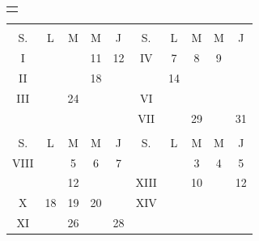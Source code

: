 \documentclass[11.9pt,letterpaper]{article}
\begin{document}
\begin{multicols}{2}
\begin{table}[H]
\begin{tabular}{|l|l|c|}
\end{tabular}
\end{table}
\newpage
\hspace*{0.5cm} 
\begin{center}
\begin{tabular}{c}
\cellcolor{gray!40}{PROGRAMACIÓN}
\end{tabular}
\end{center}
\begin{center}
\begin{tabular}{ccccc|ccccc}
\multicolumn{5}{c|}{\cellcolor{red!40}{SEPTIEMBRE}}&\multicolumn{5}{c}{\cellcolor{blue!40}{OCTUBRE}}\\
S.&L&M&M&J&S.&L&M&M&J\\
I &\cellcolor{gray!40}{9}&\cellcolor{gray!40}{10}&11&12&IV&7&8&9&\cellcolor{white}{10}\\
II&\cellcolor{gray!40}{16}&\cellcolor{gray!40}{17}&18&\cellcolor{white}{19}&\cellcolor{VIRTUAL}{V}&14&\cellcolor{gray!40}{15}&\cellcolor{EXAMEN}{$16\textcolor{TAREA}{\blacksquare}$}&\cellcolor{white}{17}\\
III&\cellcolor{white}{23}&24&\cellcolor{EXAMEN}{25}&\cellcolor{white}{26}&VI&\cellcolor{white}{21}&\cellcolor{white}{22}&\cellcolor{white}{23}&\cellcolor{white}{24}\\
&&&&&VII&\cellcolor{white}{28}&29&\cellcolor{EXAMEN}{30}&31\\
\multicolumn{5}{c|}{\cellcolor{cyan!40}{NOVIEMBRE}}&\multicolumn{5}{c}{\cellcolor{green!40}{DICIEMBRE}}\\
S.&L&M&M&J&S.&L&M&M&J\\
VIII&\cellcolor{white}{4}&5&6&7&\cellcolor{VIRTUAL}{XII}&\cellcolor{white}{2}&3&4&5\\
\cellcolor{VIRTUAL}{IX}&\cellcolor{white}{11}&12&\cellcolor{EXAMEN}{$13\textcolor{TAREA}{\blacksquare}$}&\cellcolor{white}{14}&XIII&\cellcolor{white}{9}&10&\cellcolor{EXAMEN}{$11\textcolor{TAREA}{\blacksquare}$}&12\\
X&18&19&20&\cellcolor{white}{21}&XIV&\cellcolor{gray!40}{16}&\cellcolor{gray!40}{17}&\cellcolor{gray!40}{18}&\\
XI&\cellcolor{white}{25}&26&\cellcolor{EXAMEN}{27}&28&&&&&\\
\end{tabular} 
\end{center}
\begin{center}
\begin{tabular}{lp{}}

\end{tabular}
\end{center}
\end{multicols}
\end{document}
